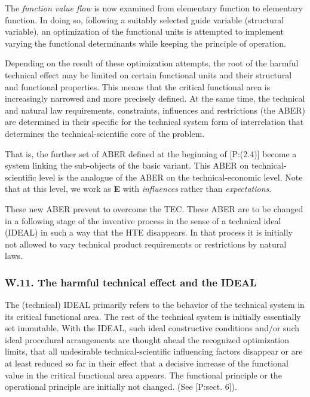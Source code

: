 \documentclass[11pt,a4paper]{article}
\begin{document}
The \emph{function value flow} is now examined from elementary function to
elementary function.  In doing so, following a suitably selected guide
variable (structural variable), an optimization of the functional units is
attempted to implement varying the functional determinants while keeping the
principle of operation.

Depending on the result of these optimization attempts, the root of the
harmful technical effect may be limited on certain functional units and their
structural and functional properties. This means that the critical functional
area is increasingly narrowed and more precisely defined.  At the same time,
the technical and natural law requirements, constraints, influences and
restrictions (the ABER) are determined in their specific for the technical
system form of interrelation that determines the technical-scientific core of
the problem.

That is, the further set of ABER defined at the beginning of [P:(2.4)] become
a system linking the sub-objects of the basic variant. This ABER on
technical-scientific level is the analogue of the ABER on the
technical-economic level. Note that at this level, we work as \textbf{E} with
\emph{influences} rather than \emph{expectations}.

These new ABER prevent to overcome the TEC. These ABER are to be changed in a
following stage of the inventive process in the sense of a technical ideal
(IDEAL) in such a way that the HTE disappears. In that process it is initially
not allowed to vary technical product requirements or restrictions by natural
laws.

\subsubsection*{W.11. The harmful technical effect and the IDEAL}

The (technical) IDEAL primarily refers to the behavior of the technical system
in its critical functional area. The rest of the technical system is initially
essentially set immutable. With the IDEAL, such ideal constructive conditions
and/or such ideal procedural arrangements are thought ahead the recognized
optimization limits, that all undesirable technical-scientific influencing
factors disappear or are at least reduced so far in their effect that a
decisive increase of the functional value in the critical functional area
appears. The functional principle or the operational principle are initially
not changed. (See [P:sect. 6]).
\end{document}
